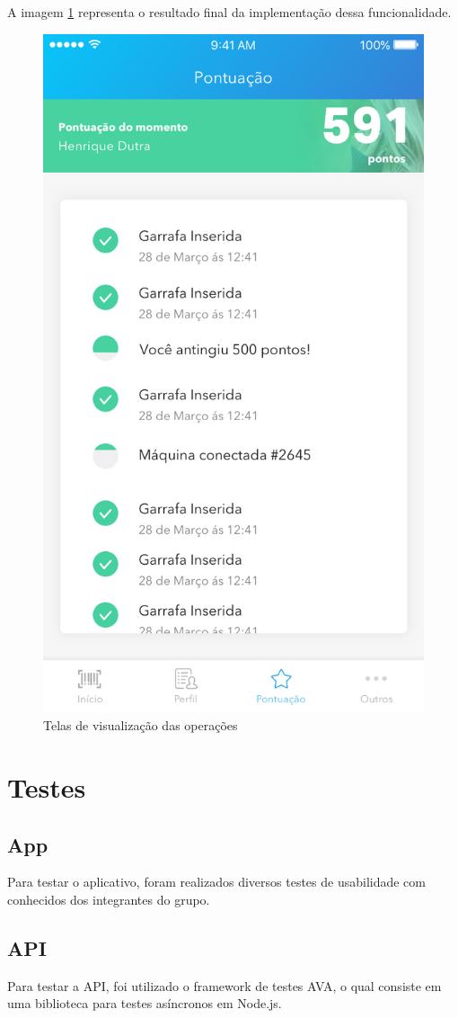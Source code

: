 A imagem \ref{fig:operation} representa o resultado final da implementação dessa funcionalidade.

\begin{figure}[!ht]
	\centering
		\includegraphics[scale=0.2]{figuras/software/pontuacao.png}
	\caption{Telas de visualização das operações}
	\label{fig:operation}
\end{figure}

\section{Testes}

\subsection{App}

Para testar o aplicativo, foram realizados diversos testes de usabilidade com conhecidos dos integrantes do grupo.

\subsection{API}

Para testar a API, foi utilizado o framework de testes AVA, o qual consiste em uma biblioteca para testes asíncronos em Node.js.
